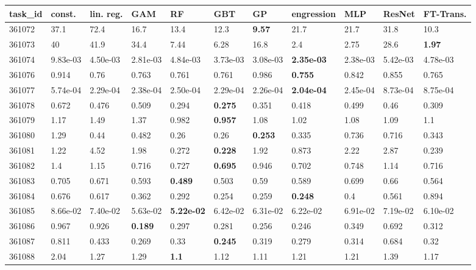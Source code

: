 \begin{table}[ht!]
\centering
\begingroup\footnotesize
\begin{tabular}{lllllllllll}
  \hline
\hline
task\_id & const. & lin. reg. & GAM & RF & GBT & GP & engression & MLP & ResNet & FT-Trans. \\ 
  \hline
361072 & 37.1 & 72.4 & 16.7 & 13.4 & 12.3 & \textbf{9.57} & 21.7 & 21.7 & 31.8 & 10.3 \\ 
  361073 & 40 & 41.9 & 34.4 & 7.44 & 6.28 & 16.8 & 2.4 & 2.75 & 28.6 & \textbf{1.97} \\ 
  361074 & 9.83e-03 & 4.50e-03 & 2.81e-03 & 4.84e-03 & 3.73e-03 & 3.08e-03 & \textbf{2.35e-03} & 2.38e-03 & 5.42e-03 & 4.78e-03 \\ 
  361076 & 0.914 & 0.76 & 0.763 & 0.761 & 0.761 & 0.986 & \textbf{0.755} & 0.842 & 0.855 & 0.765 \\ 
  361077 & 5.74e-04 & 2.29e-04 & 2.38e-04 & 2.50e-04 & 2.29e-04 & 2.26e-04 & \textbf{2.04e-04} & 2.45e-04 & 8.73e-04 & 8.75e-04 \\ 
  361078 & 0.672 & 0.476 & 0.509 & 0.294 & \textbf{0.275} & 0.351 & 0.418 & 0.499 & 0.46 & 0.309 \\ 
  361079 & 1.17 & 1.49 & 1.37 & 0.982 & \textbf{0.957} & 1.08 & 1.02 & 1.08 & 1.09 & 1.1 \\ 
  361080 & 1.29 & 0.44 & 0.482 & 0.26 & 0.26 & \textbf{0.253} & 0.335 & 0.736 & 0.716 & 0.343 \\ 
  361081 & 1.22 & 4.52 & 1.98 & 0.272 & \textbf{0.228} & 1.92 & 0.873 & 2.22 & 2.87 & 0.239 \\ 
  361082 & 1.4 & 1.15 & 0.716 & 0.727 & \textbf{0.695} & 0.946 & 0.702 & 0.748 & 1.14 & 0.716 \\ 
  361083 & 0.705 & 0.671 & 0.593 & \textbf{0.489} & 0.503 & 0.59 & 0.589 & 0.699 & 0.66 & 0.564 \\ 
  361084 & 0.676 & 0.617 & 0.362 & 0.292 & 0.254 & 0.259 & \textbf{0.248} & 0.4 & 0.561 & 0.894 \\ 
  361085 & 8.66e-02 & 7.40e-02 & 5.63e-02 & \textbf{5.22e-02} & 6.42e-02 & 6.31e-02 & 6.22e-02 & 6.91e-02 & 7.19e-02 & 6.10e-02 \\ 
  361086 & 0.967 & 0.926 & \textbf{0.189} & 0.297 & 0.281 & 0.256 & 0.246 & 0.349 & 0.692 & 0.312 \\ 
  361087 & 0.811 & 0.433 & 0.269 & 0.33 & \textbf{0.245} & 0.319 & 0.279 & 0.314 & 0.684 & 0.32 \\ 
  361088 & 2.04 & 1.27 & 1.29 & \textbf{1.1} & 1.12 & 1.11 & 1.21 & 1.21 & 1.39 & 1.17 \\ 

\end{tabular}
\end{table}
